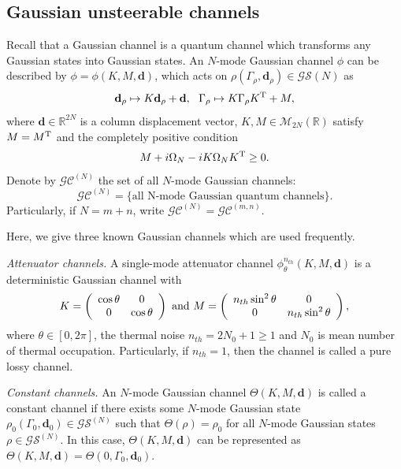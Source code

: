 \documentclass[10pt,aps,pra,amsfonts,amssymb,amsmath,%
floatfix,nofootinbib, groupedaddress,superscriptaddress,citesort,twocolumn
]{revtex4}%
\begin{document}
 \subsection{ Gaussian  unsteerable  channels}


Recall that a Gaussian channel is a quantum channel which transforms any  Gaussian states into Gaussian states\cite{PMGH,CEGH}.  An $N$-mode Gaussian channel $\phi $ can be described by $\phi=\phi \left( {K,M,\mathbf d} \right)$, which acts on $\rho ( \Gamma_\rho ,\mathbf d_\rho )\in\mathcal {GS}(N)$ as
 \begin{eqnarray}\label{E11}
 	\mathbf d_\rho \mapsto K \mathbf d_\rho +\mathbf d,\ \
 	\Gamma_\rho  \mapsto K\Gamma_\rho K^{\rm T}+  M,
 \end{eqnarray}
where $\mathbf d \in \mathbb R^{2N}$ is a column displacement vector,  $K,M\in \mathcal M_{2N}(\mathbb R)$   satisfy $ M = M^{\rm T}$ and the completely positive condition
 \begin{eqnarray}\label{N0}
 	M + i\Omega_N  - iK\Omega_N {K^{\rm T}} \ge 0.
 \end{eqnarray}
Denote by %
${\mathcal {GC}}^{(N)}$ the set of all  $N$-mode Gaussian channels:
$${\mathcal {GC}}^{(N)}=\{  \mbox{all N-mode Gaussian quantum channels}\}. $$Particularly, if $N=m+n$, write ${\mathcal {GC}}^{(N)}={\mathcal {GC}}^{(m,n)}$.

Here, we give three known Gaussian channels which are used frequently.


{\it Attenuator channels.}  A single-mode attenuator channel $\phi_{\theta}^{n_{th}}(K,M,\mathbf d)$ is a deterministic Gaussian
	channel \cite{S1} with
\begin{eqnarray*}
	K  =%
	\left({\begin{array}{*{20}{c}}\cos\theta&0\\ 0&\cos\theta\end{array}} \right) \ {\rm and}\
	M =%
	\left( {\begin{array}{*{20}{c}}n_{th}\sin^2\theta &0\\0&n_{th}\sin^2\theta \end{array}} \right),
\end{eqnarray*}
where  $\theta \in [0,2\pi]$,  the thermal noise $n_{th}=2N_0+1\ge 1$ and  $N_0$ is mean number of thermal occupation. Particularly,  if $ n_{th}=1$, then the channel is  called  a pure lossy channel.

{\it Constant channels.}  An $N$-mode Gaussian channel  $\Theta(K,M,\mathbf d)$ is called a constant channel if  there exists some $N$-mode Gaussian state $\rho_0(\Gamma_0,  {\mathbf d}_0) \in \mathcal {GS}^{(N)}$ such that $\Theta(\rho)=\rho_0$  for all
$N$-mode Gaussian states 	$\rho\in  \mathcal{GS}^{(N)}$. In this case, $\Theta(K,M, \mathbf d)$ can be represented as $\Theta(K,M,\mathbf d)=\Theta(0, \Gamma_0,\mathbf {\mathbf d}_0)$.
	
\end{document}
